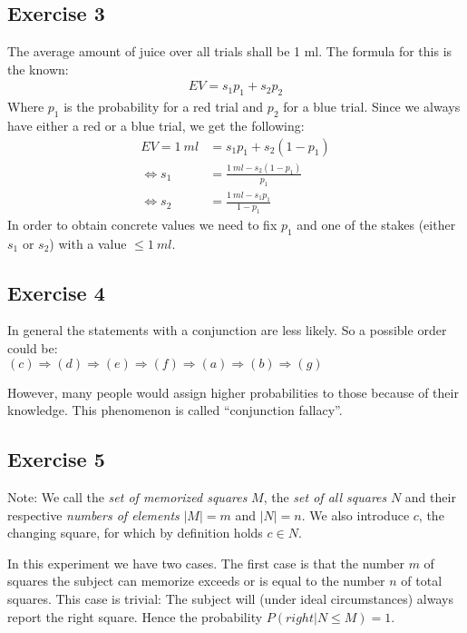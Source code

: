 \subsection*{Exercise 3}
The average amount of juice over all trials shall be 1 ml. The formula for this 
is the known:
\begin{align*}
EV = s_1 p_1 + s_2 p_2
\end{align*}
Where $p_1$ is the probability for a red trial and $p_2$ for a blue trial. 
Since we always have either a red or a blue trial, we get the following:
\begin{align*}
EV = 1 \  ml &= s_1 p_1 + s_2 (1 - p_1)\\
\Leftrightarrow s_1 &= \frac{1 \  ml - s_2 (1 - p_1)}{p_1}\\
\Leftrightarrow s_2 &= \frac{1 \  ml - s_1 p_1}{1 - p_1}
\end{align*}
In order to obtain concrete values we need to fix $p_1$ and one of the stakes 
(either $s_1$ or $s_2$) with a value $\leq 1 \  ml$.


\subsection*{Exercise 4}
In general the statements with a conjunction are less likely. So a possible order could be:\\
$(c)\Rightarrow(d)\Rightarrow(e)\Rightarrow(f)\Rightarrow(a)\Rightarrow(b)\Rightarrow(g)$

However, many people would assign higher probabilities to those because of their knowledge. This phenomenon is called ``conjunction fallacy''.

\subsection*{Exercise 5}
{\footnotesize Note: We call the \textit{set of memorized squares} $M$, the 
\textit{set of all squares} $N$ and their respective \textit{numbers of elements} 
$|M| = m$ and $|N| = n$. We also introduce $c$, the changing square, for which 
by definition holds $c \in N$.}

In this experiment we have two cases. The first case is that the number $m$ of 
squares the subject can memorize exceeds or is equal to the number $n$ of total 
squares. This case is trivial: The subject will (under ideal circumstances) 
always report the right square. Hence the probability $P(right | N \leq M) = 1$.

